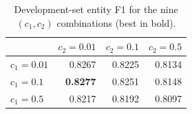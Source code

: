 \begin{table}[t]
\centering
\small
\caption{Development-set entity F1 for the nine $(c_1,c_2)$ combinations (best in bold).}
\label{tab:grid}
\begin{tabular}{lrrr}
\toprule
 & $c_2=0.01$ & $c_2=0.1$ & $c_2=0.5$ \\
\midrule
$c_1=0.01$ & 0.8267 & 0.8225 & 0.8134 \\
$c_1=0.1$ & \textbf{0.8277} & 0.8251 & 0.8148 \\
$c_1=0.5$ & 0.8217 & 0.8192 & 0.8097 \\
\bottomrule
\end{tabular}
\end{table}
